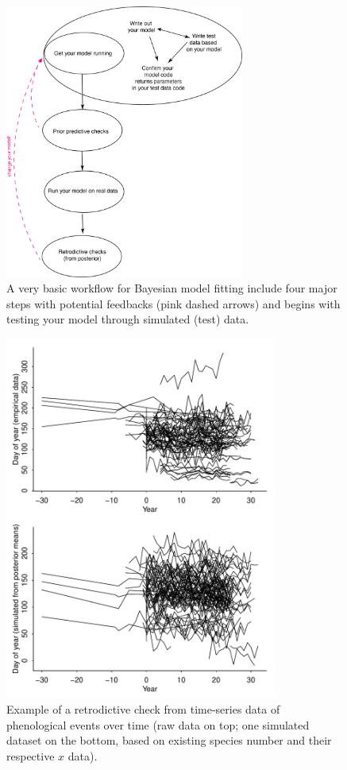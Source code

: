 \documentclass[11pt]{article}
\begin{document}
\begin{figure}[ht]
\centering
\noindent \includegraphics[width=0.7\textwidth]{figures/workflow.png}
\caption{A very basic workflow for Bayesian model fitting include four major steps with potential feedbacks (pink dashed arrows) and begins with testing your model through simulated (test) data.}
\label{fig:workflow}
\end{figure}

\begin{figure}[ht]
\centering
\noindent \includegraphics[width=0.8\textwidth]{examples/synchrony/graphs/rawvsonepredictivecheck.pdf}
\caption{Example of a retrodictive check from time-series data of phenological events over time (raw data on top; one simulated dataset on the bottom, based on existing species number and their respective $x$ data).}
\label{fig:retrodictivecheck}
\end{figure}
\end{document}

